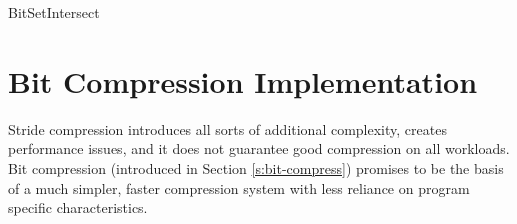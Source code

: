 \documentclass[12pt,twoside]{reedthesis}
\begin{document}
			\begin{algorithm}
				\caption{BitSetIntersect}
				\label{bitsetintersect}
				\begin{algorithmic}[1]
					
					
					\Else
					\EndIf
					\EndFor
					
					\EndFunction
				\end{algorithmic}
			\end{algorithm}
			
			
			
			
			
			
		
			
			
					
		\section{Bit Compression Implementation}
			
			Stride compression introduces all sorts of additional complexity, creates performance issues, and it does not guarantee good compression on all workloads. Bit compression (introduced in Section \ref{s:bit-compress}) promises to be the basis of a much simpler, faster compression system with less reliance on program specific characteristics. 
			
\end{document}
